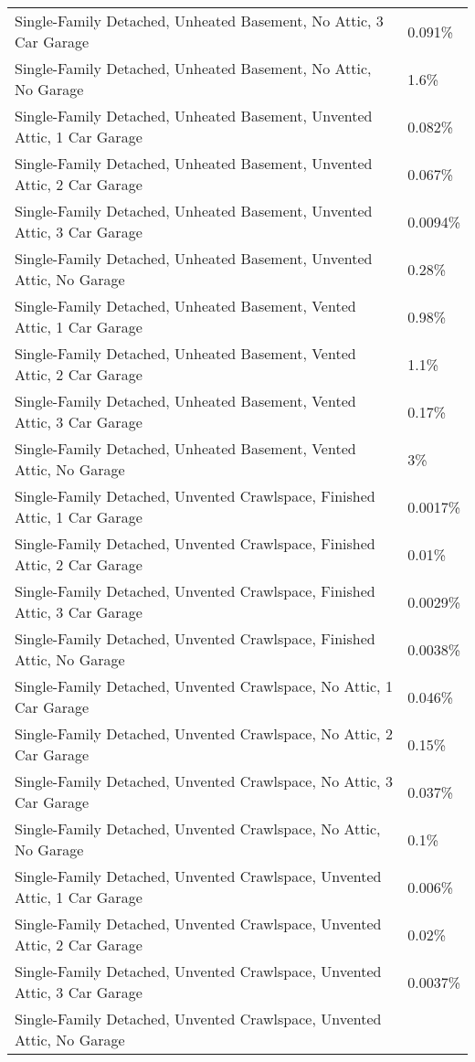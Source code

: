 \begin{longtable}[]{@{}ll@{}}
Single-Family Detached, Unheated Basement, No Attic, 3 Car Garage &
0.091\% \\
Single-Family Detached, Unheated Basement, No Attic, No Garage &
1.6\% \\
Single-Family Detached, Unheated Basement, Unvented Attic, 1 Car Garage
& 0.082\% \\
Single-Family Detached, Unheated Basement, Unvented Attic, 2 Car Garage
& 0.067\% \\
Single-Family Detached, Unheated Basement, Unvented Attic, 3 Car Garage
& 0.0094\% \\
Single-Family Detached, Unheated Basement, Unvented Attic, No Garage &
0.28\% \\
Single-Family Detached, Unheated Basement, Vented Attic, 1 Car Garage &
0.98\% \\
Single-Family Detached, Unheated Basement, Vented Attic, 2 Car Garage &
1.1\% \\
Single-Family Detached, Unheated Basement, Vented Attic, 3 Car Garage &
0.17\% \\
Single-Family Detached, Unheated Basement, Vented Attic, No Garage &
3\% \\
Single-Family Detached, Unvented Crawlspace, Finished Attic, 1 Car
Garage & 0.0017\% \\
Single-Family Detached, Unvented Crawlspace, Finished Attic, 2 Car
Garage & 0.01\% \\
Single-Family Detached, Unvented Crawlspace, Finished Attic, 3 Car
Garage & 0.0029\% \\
Single-Family Detached, Unvented Crawlspace, Finished Attic, No Garage &
0.0038\% \\
Single-Family Detached, Unvented Crawlspace, No Attic, 1 Car Garage &
0.046\% \\
Single-Family Detached, Unvented Crawlspace, No Attic, 2 Car Garage &
0.15\% \\
Single-Family Detached, Unvented Crawlspace, No Attic, 3 Car Garage &
0.037\% \\
Single-Family Detached, Unvented Crawlspace, No Attic, No Garage &
0.1\% \\
Single-Family Detached, Unvented Crawlspace, Unvented Attic, 1 Car
Garage & 0.006\% \\
Single-Family Detached, Unvented Crawlspace, Unvented Attic, 2 Car
Garage & 0.02\% \\
Single-Family Detached, Unvented Crawlspace, Unvented Attic, 3 Car
Garage & 0.0037\% \\
Single-Family Detached, Unvented Crawlspace, Unvented Attic, No Garage &

\end{longtable}
